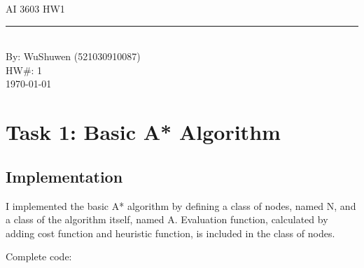 \documentclass[aps,letterpaper,10pt]{revtex4}
\newcommand{\labtitle}{AI 3603 HW1}
\newcommand{\authorname}{WuShuwen (521030910087)}
\newcommand{\hw}{1}
\begin{document}


\begin{titlepage}
\begin{center}
{\Large \textsc{\labtitle} \\ \vspace{4pt}}
\rule[13pt]{\textwidth}{1pt} \\ \vspace{150pt}
{\large By: \authorname \\ \vspace{10pt}
HW\#: \hw \\ \vspace{10pt}
\today}
\end{center}
\end{titlepage}

\section{Task 1: Basic A* Algorithm}
\begin{figure}[H]
	  \centering
	  \caption{}
	  \label{fig:oscil}
	\end{figure}
\subsection{Implementation}
I implemented the basic A* algorithm by defining a class of nodes, named N, and a class of the algorithm itself, named A. Evaluation function, calculated by adding cost function and heuristic function, is included in the class of nodes.

\vspace{3mm}
Complete code:
\end{document}

